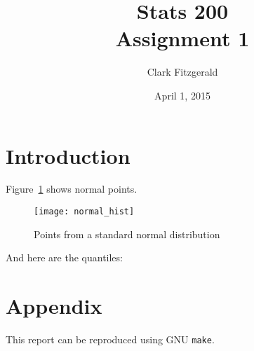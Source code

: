 \documentclass[12pt]{article}
\begin{document}
\title{Stats 200
    \\ Assignment 1}
\date{April 1, 2015}
\author{Clark Fitzgerald}
\maketitle

\section{Introduction}

Figure~\ref{fig:normal_hist} shows normal points.

\begin{figure}
    \centering
    \texttt{[image: normal\_hist]}
    \caption{Points from a standard normal distribution}
    \label{fig:normal_hist}
\end{figure}

And here are the quantiles:

\begin{center}

\end{center}


\newpage

\section{Appendix}

This report can be reproduced using GNU \texttt{make}.




\end{document}
